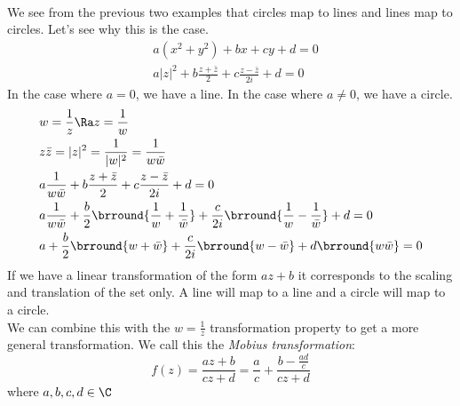 \\
We see from the previous two examples that circles map to lines and lines map to circles. Let's see why this is the case.
\begin{align*}
    &a(x^2+y^2)+bx+cy+d=0\\
    &a|z|^2+b\frac{z+\bar{z}}{2}+c\frac{z-\bar{z}}{2i}+d=0
\end{align*}
In the case where $a=0$, we have a line. In the case where $a\neq0$, we have a circle.
\begin{align*}
    &w=\frac{1}{z}\Ra z=\frac{1}{w}\\
    &z\bar{z}=|z|^2=\frac{1}{|w|^2}=\frac{1}{w\bar{w}}\\
    &a\frac{1}{w\bar{w}}+b\frac{z+\bar{z}}{2}+c\frac{z-\bar{z}}{2i}+d=0\\
    &a\frac{1}{w\bar{w}}+\frac{b}{2}\brround{\frac{1}{w}+\frac{1}{\bar{w}}}+\frac{c}{2i}\brround{\frac{1}{w}-\frac{1}{\bar{w}}}+d=0\\
    &a+\frac{b}{2}\brround{w+\bar{w}}+\frac{c}{2i}\brround{w-\bar{w}}+d\brround{w\bar{w}}=0\\
\end{align*}
If we have a linear transformation of the form $az+b$ it corresponds to the scaling and translation of the set only. A line will map to a line and a circle will map to a circle.\\
We can combine this with the $w=\frac{1}{z}$ transformation property to get a more general transformation. We call this the \textit{Mobius transformation}:
$$f(z)=\frac{az+b}{cz+d}=\frac{a}{c}+\frac{b-\tfrac{ad}{c}}{cz+d}$$
where $a,b,c,d\in\C$

